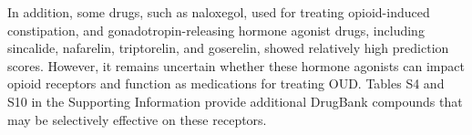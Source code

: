 \documentclass[10pt]{article}
\begin{document}
		In addition, some drugs, such as naloxegol, used for treating opioid-induced constipation, and gonadotropin-releasing hormone agonist drugs, including sincalide, nafarelin, triptorelin, and goserelin, showed relatively high prediction scores. However, it remains uncertain whether these hormone agonists can impact opioid receptors and function as medications for treating OUD. Tables S4 and S10 in the Supporting Information provide additional DrugBank compounds that may be selectively effective on these receptors.
		
		
		
		
\end{document}
